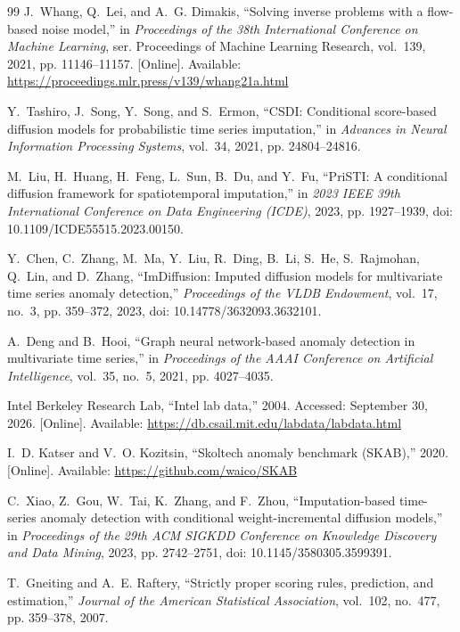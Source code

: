 \documentclass[conference]{IEEEtran}
\newcommand{\1}{\mathbf{1}}
\begin{document}
\begin{thebibliography}{99}
J.~Whang, Q.~Lei, and A.~G. Dimakis, ``Solving inverse problems with
a flow-based noise model,'' in \emph{Proceedings of the 38th
International Conference on Machine Learning}, ser. Proceedings
of Machine Learning Research, vol.~139, 2021, pp. 11146--11157.
[Online]. Available:
\url{https://proceedings.mlr.press/v139/whang21a.html}

Y.~Tashiro, J.~Song, Y.~Song, and S.~Ermon, ``{CSDI}: Conditional
score-based diffusion models for probabilistic time series
imputation,'' in \emph{Advances in Neural Information Processing
Systems}, vol.~34, 2021, pp. 24804--24816.

M.~Liu, H.~Huang, H.~Feng, L.~Sun, B.~Du, and Y.~Fu, ``{PriSTI}:
A conditional diffusion framework for spatiotemporal imputation,''
in \emph{2023 IEEE 39th International Conference on Data Engineering
(ICDE)}, 2023, pp. 1927--1939,
doi: 10.1109/ICDE55515.2023.00150.

Y.~Chen, C.~Zhang, M.~Ma, Y.~Liu, R.~Ding, B.~Li, S.~He,
S.~Rajmohan, Q.~Lin, and D.~Zhang, ``{ImDiffusion}: Imputed
diffusion models for multivariate time series anomaly detection,''
\emph{Proceedings of the VLDB Endowment}, vol.~17, no.~3,
pp. 359--372, 2023, doi: 10.14778/3632093.3632101.

A.~Deng and B.~Hooi, ``Graph neural network-based anomaly detection
in multivariate time series,'' in \emph{Proceedings of the AAAI
Conference on Artificial Intelligence}, vol.~35, no.~5, 2021,
pp. 4027--4035.

{Intel Berkeley Research Lab}, ``Intel lab data,'' 2004.
Accessed: September 30, 2026. [Online]. Available:
\url{https://db.csail.mit.edu/labdata/labdata.html}

I.~D. Katser and V.~O. Kozitsin, ``Skoltech anomaly benchmark
({SKAB}),'' 2020. [Online]. Available:
\url{https://github.com/waico/SKAB}

C.~Xiao, Z.~Gou, W.~Tai, K.~Zhang, and F.~Zhou,
``Imputation-based time-series anomaly detection with conditional
weight-incremental diffusion models,'' in \emph{Proceedings of
the 29th ACM SIGKDD Conference on Knowledge Discovery and Data
Mining}, 2023, pp. 2742--2751,
doi: 10.1145/3580305.3599391.

T.~Gneiting and A.~E. Raftery, ``Strictly proper scoring rules,
prediction, and estimation,'' \emph{Journal of the American
Statistical Association}, vol.~102, no.~477, pp. 359--378, 2007.

\end{thebibliography}
\end{document}

